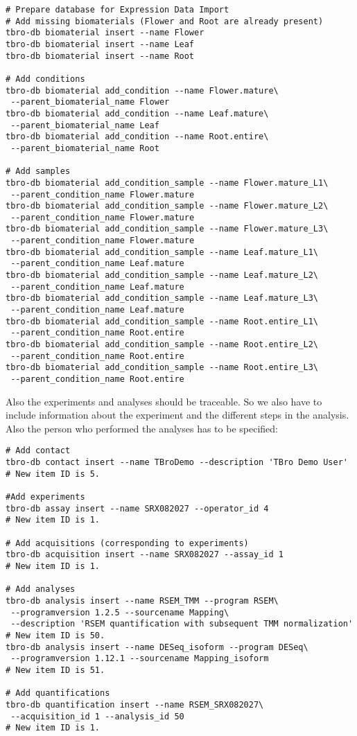 \documentclass[english]{scrartcl}
\begin{document}
\begin{lstlisting}
# Prepare database for Expression Data Import
# Add missing biomaterials (Flower and Root are already present)
tbro-db biomaterial insert --name Flower
tbro-db biomaterial insert --name Leaf
tbro-db biomaterial insert --name Root

# Add conditions
tbro-db biomaterial add_condition --name Flower.mature\
 --parent_biomaterial_name Flower
tbro-db biomaterial add_condition --name Leaf.mature\
 --parent_biomaterial_name Leaf
tbro-db biomaterial add_condition --name Root.entire\
 --parent_biomaterial_name Root

# Add samples
tbro-db biomaterial add_condition_sample --name Flower.mature_L1\
 --parent_condition_name Flower.mature
tbro-db biomaterial add_condition_sample --name Flower.mature_L2\
 --parent_condition_name Flower.mature
tbro-db biomaterial add_condition_sample --name Flower.mature_L3\
 --parent_condition_name Flower.mature
tbro-db biomaterial add_condition_sample --name Leaf.mature_L1\
 --parent_condition_name Leaf.mature
tbro-db biomaterial add_condition_sample --name Leaf.mature_L2\
 --parent_condition_name Leaf.mature
tbro-db biomaterial add_condition_sample --name Leaf.mature_L3\
 --parent_condition_name Leaf.mature
tbro-db biomaterial add_condition_sample --name Root.entire_L1\
 --parent_condition_name Root.entire
tbro-db biomaterial add_condition_sample --name Root.entire_L2\
 --parent_condition_name Root.entire
tbro-db biomaterial add_condition_sample --name Root.entire_L3\
 --parent_condition_name Root.entire
\end{lstlisting}

Also the experiments and analyses should be traceable. So we also have to
include information about the experiment and the different steps in the
analysis. Also the person who performed the analyses has to be specified:

\begin{lstlisting}
# Add contact
tbro-db contact insert --name TBroDemo --description 'TBro Demo User' 
# New item ID is 5.

#Add experiments 
tbro-db assay insert --name SRX082027 --operator_id 4
# New item ID is 1.

# Add acquisitions (corresponding to experiments)
tbro-db acquisition insert --name SRX082027 --assay_id 1
# New item ID is 1.

# Add analyses 
tbro-db analysis insert --name RSEM_TMM --program RSEM\
 --programversion 1.2.5 --sourcename Mapping\
 --description 'RSEM quantification with subsequent TMM normalization'
# New item ID is 50.
tbro-db analysis insert --name DESeq_isoform --program DESeq\
 --programversion 1.12.1 --sourcename Mapping_isoform
# New item ID is 51.

# Add quantifications
tbro-db quantification insert --name RSEM_SRX082027\
 --acquisition_id 1 --analysis_id 50
# New item ID is 1.
\end{lstlisting}
\end{document}
